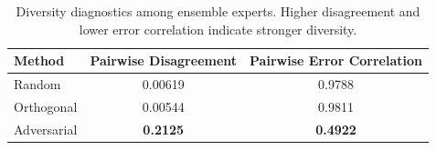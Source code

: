 \begin{table}[t]
\centering
\begin{tabular}{@{}lcc@{}}
\toprule
Method & Pairwise Disagreement & Pairwise Error Correlation \\
\midrule
Random & 0.00619 & 0.9788 \\
Orthogonal & 0.00544 & 0.9811 \\
Adversarial & {\bf 0.2125} & {\bf 0.4922} \\
\bottomrule
\end{tabular}
\caption{Diversity diagnostics among ensemble experts. Higher disagreement and lower error correlation indicate stronger diversity.}
\label{tab:diversity}
\end{table}
